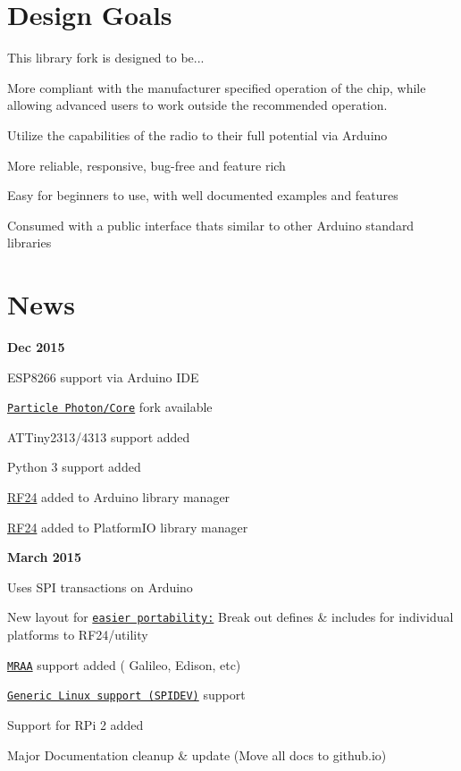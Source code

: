 \hypertarget{index_Goals}{}\section{Design Goals}\label{index_Goals}
This library fork is designed to be... \begin{DoxyItemize}
\item More compliant with the manufacturer specified operation of the chip, while allowing advanced users to work outside the recommended operation. \item Utilize the capabilities of the radio to their full potential via Arduino \item More reliable, responsive, bug-\/free and feature rich \item Easy for beginners to use, with well documented examples and features \item Consumed with a public interface that\textquotesingle{}s similar to other Arduino standard libraries\end{DoxyItemize}
\hypertarget{index_News}{}\section{News}\label{index_News}
{\bfseries Dec 2015}~\newline

\begin{DoxyItemize}
\item E\+S\+P8266 support via Arduino I\+DE
\item \href{https://github.com/stewarthou/Particle-RF24}{\tt Particle Photon/\+Core} fork available
\item A\+T\+Tiny2313/4313 support added
\item Python 3 support added
\item \hyperlink{classRF24}{R\+F24} added to Arduino library manager
\item \hyperlink{classRF24}{R\+F24} added to Platform\+IO library manager
\end{DoxyItemize}

{\bfseries March 2015}~\newline

\begin{DoxyItemize}
\item Uses S\+PI transactions on Arduino
\item New layout for \href{Portability.html}{\tt easier portability\+:} Break out defines \& includes for individual platforms to R\+F24/utility
\item \href{MRAA.html}{\tt M\+R\+AA} support added ( Galileo, Edison, etc)
\item \href{Linux.html}{\tt Generic Linux support (S\+P\+I\+D\+EV)} support
\item Support for R\+Pi 2 added
\item Major Documentation cleanup \& update (Move all docs to github.\+io)
\end{DoxyItemize}

